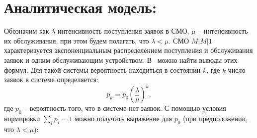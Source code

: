 \documentclass[a4paper,12 pt]{article}
\begin{document}
\section*{Аналитическая модель:}
Обозначим как $\lambda $ интенсивность поступления заявок в СМО, $\mu$ -- интенсивность их обслуживания, при этом будем полагать, что $\lambda < \mu$. 
СМО $M|M|1$ характеризуется экспоненциальным распределением поступления и обслуживания заявок и одним обслуживающим устройством. В~\cite{kleinrock1975queuing} можно найти выводы этих формул. Для такой системы вероятность находиться в состоянии $k$, где $k$ число заявок в системе определяется:
\begin{equation*}
p_k = p_0 (\frac{\lambda}{\mu})^k,
\end{equation*}
где $p_0$ -- вероятность того, что в системе нет заявок. С помощью условия нормировки $\sum_i p_i = 1$ можно получить выражение для $p_0$ (при предположении, что $\lambda < \mu$):
\end{document}
